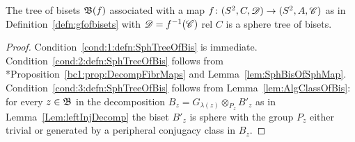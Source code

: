 \documentclass{amsart}
\begin{document}
\begin{lem}
  The tree of bisets ${\mathfrak B}(f)$ associated with a map
  $f\colon (S^2,C,{\mathscr D})\to (S^2,A,{\mathscr C})$ as in
  Definition~\ref{defn:gfofbisets} with ${\mathscr D}=f^{-1}({\mathscr C})$ rel $C$ is a
  sphere tree of bisets.
\end{lem}
\begin{proof}
  Condition~\eqref{cond:1:defn:SphTreeOfBis} is
  immediate. Condition~\eqref{cond:2:defn:SphTreeOfBis} follows from
  \cite{bartholdi-dudko:bc1}*{Proposition~\ref{bc1:prop:DecompFibrMaps}}
  and
  Lemma~\ref{lem:SphBisOfSphMap}. Condition~\eqref{cond:3:defn:SphTreeOfBis}
  follows from Lemma~\ref{lem:AlgClassOfBis}: for every $z\in
  {\mathfrak B}$ in the decomposition $B_z=G_{\lambda(z)}\otimes_{P_z}
  B'_z$ as in Lemma~\ref{Lem:leftInjDecomp} the biset $B'_z$ is sphere
  with the group $P_z$ either trivial or generated by a peripheral
  conjugacy class in $B_z$.
\end{proof}
\end{document}
